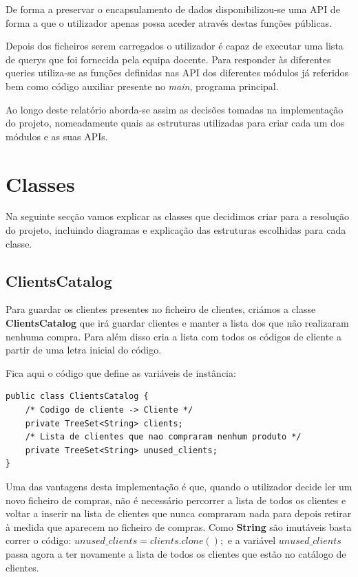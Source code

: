 \documentclass[10pt] {article}
\begin{document}
De forma a preservar o encapsulamento de dados disponibilizou-se uma API de
forma a que o utilizador apenas possa aceder através destas funções públicas.

Depois dos ficheiros serem carregados o utilizador é capaz de executar uma lista de querys que foi fornecida pela equipa docente.
Para responder às diferentes queries utiliza-se as funções definidas nas API dos diferentes módulos já referidos bem como código auxiliar presente no \emph{main}, programa principal.

Ao longo deste relatório aborda-se assim as decisões tomadas na implementação do projeto, nomeadamente quais as estruturas utilizadas para criar cada um dos módulos e as suas APIs.


\newpage
\section{Classes}
Na seguinte secção vamos explicar as classes que decidimos criar para a resolução do projeto, incluindo diagramas e explicação das estruturas escolhidas para cada classe.

\subsection{ClientsCatalog}

Para guardar os clientes presentes no ficheiro de clientes, criámos a classe \color{blue} \textbf{ClientsCatalog} \color{black} que 
irá guardar clientes e manter a lista dos que não realizaram nenhuma compra.
Para além disso cria a lista com todos os códigos de cliente a partir de uma letra inicial do código.

Fica aqui o código que define as variáveis de instância:

\begin{lstlisting}
public class ClientsCatalog {
	/* Codigo de cliente -> Cliente */
	private TreeSet<String> clients;
	/* Lista de clientes que nao compraram nenhum produto */
	private TreeSet<String> unused_clients;
}
\end{lstlisting}


Uma das vantagens desta implementação é que, quando o utilizador decide ler um novo ficheiro de compras, não é necessário percorrer a lista de todos os clientes e voltar a inserir na lista de clientes que nunca compraram nada para depois retirar à medida que aparecem no ficheiro de compras.
Como \color{blue} \textbf{String} \color{black}são imutáveis basta correr o código:
$unused\_clients = clients.clone();$ e a variável $unused\_clients$ passa agora a ter novamente a lista de todos os clientes que estão no catálogo de clientes.
\end{document}
